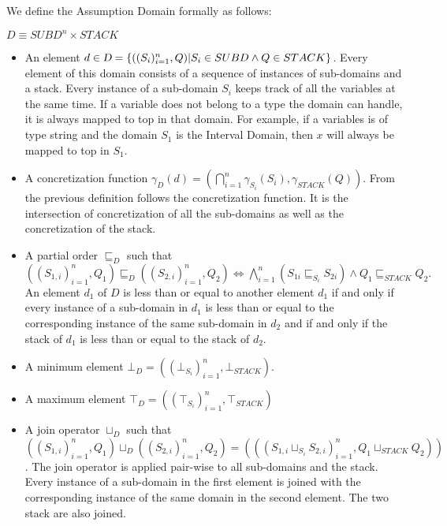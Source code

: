 \documentclass[]{report}
\begin{document}
We define the Assumption Domain formally as follows: \\
\begin{center}
	$D \equiv SUBD^{n} \times STACK$\\	
\end{center}
\begin{itemize}
	\item An element $d \in \textsl{D} = \lbrace ((S_{i})_{i=1}^{n}, Q) \vert S_{i} \in SUBD \wedge Q \in STACK \rbrace$. Every element of this domain consists of a sequence of instances of sub-domains and a stack. Every instance of a sub-domain $ S_{i} $ keeps track of all the variables at the same time. If a variable does not belong to a type the domain can handle, it is always mapped to top in that domain. For example, if a variables is of type string and the domain $ S_{1} $ is the Interval Domain, then $ x $ will always be mapped to top in $ S_{1} $.
	\item A concretization function $\gamma_{D}(d) =( \bigcap\limits_{i=1}^{n}\gamma_{S_{i}}(S_{i}), \gamma_{STACK}(Q)).$ From the previous definition follows the concretization function. It is the intersection of concretization of all the sub-domains as well as the concretization of the stack. 
	\item A partial order $\sqsubseteq_{D}$ such that $ ((S_{1,i})_{i=1}^{n}, Q_{1}) \sqsubseteq_{D} ((S_{2, i})_{i=1}^{n}, Q_{2}) \Longleftrightarrow \bigwedge\limits_{i=1}^{n}(S_{1i} \sqsubseteq_{S_{i}} S_{2i}) \wedge Q_{1} \sqsubseteq_{STACK} Q_{2} .$ An element $ d_{1} $ of $ D $ is less than or equal to another element $ d_{1} $ if and only if every instance of a sub-domain in $ d_{1} $ is less than or equal to the corresponding instance of the same sub-domain in $ d_{2} $ and if and only if the stack of $ d_{1} $ is less than or equal to the stack of $ d_{2} $.
	\item A minimum element $\bot_{D} = ((\bot_{S_{i}})_{i=1}^{n}, \bot_{STACK})$.   
	\item A maximum element $\top_{D} =  ((\top_{S_{i}})_{i=1}^{n}, \top_{STACK})$
	\item A join operator $\sqcup_{D}$ such that $ ((S_{1,i})_{i=1}^{n}, Q_{1}) \sqcup_{D} ((S_{2,i})_{i=1}^{n}, Q_{2}) = (((S_{1,i} \sqcup_{S_{i}} S_{2,i})_{i=1}^{n}, Q_{1} \sqcup_{STACK} Q_{2}))$. The join operator is applied pair-wise to all sub-domains and the stack. Every instance of a sub-domain in the first element is joined with the corresponding instance of the same domain in the second element. The two stack are also joined. 

\end{itemize}
\end{document}
